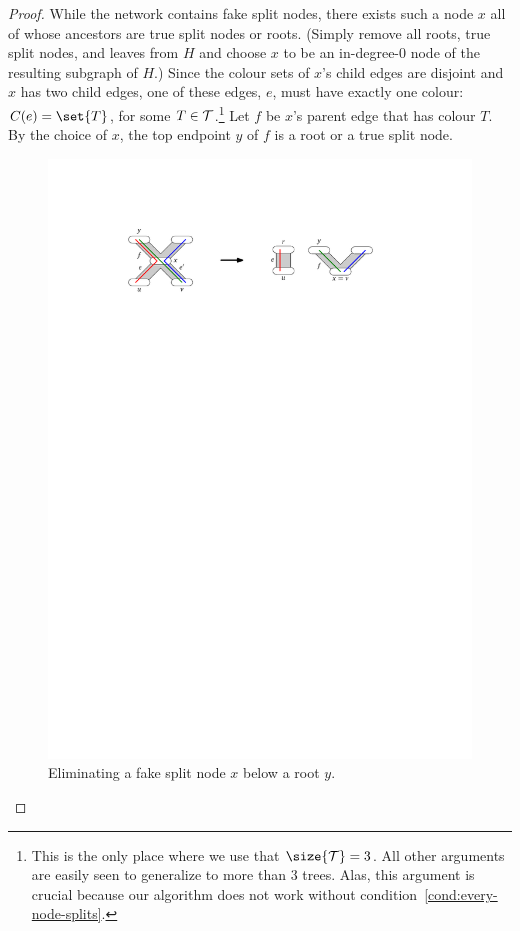 \begin{proof}
  While the network contains fake split nodes, there exists such a node $x$ all of whose ancestors are true split nodes or roots.   (Simply remove all roots, true split nodes, and leaves from $H$ and choose   $x$ to be an in-degree-$0$ node of the resulting subgraph of $H$.)   Since the colour sets of $x$'s child edges are disjoint and $x$ has two child   edges, one of these edges, $e$, must have exactly one colour:   $C(e) = \set{T}$, for some $T \in \mathcal{T}$.\footnote{This is the only place where we use that $\size{\T} = 3$.  All other arguments are easily seen to generalize to more than $3$ trees.     Alas, this argument is crucial because our algorithm does not work without     condition~\ref{cond:every-node-splits}.}   Let $f$ be $x$'s parent edge that has colour $T$.   By the choice of $x$, the top endpoint $y$ of $f$ is a root or a true split   node.

  \begin{figure}
    \centering
    \includegraphics{../figs/ch4/root-transformation}
    \caption{Eliminating a fake split node $x$ below a root $y$.}
    \label{fig:root-transformation}
  \end{figure}


\end{proof}
